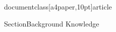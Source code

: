 documentclass[a4paper,10pt]{article}
\usepackage[a4paper, total={6in, 8in}]{geometry}

\usepackage[utf8]{inputenc}
\usepackage{verbatim}
\usepackage{fancyvrb}
\usepackage{listings}
\usepackage{graphicx}

\graphicspath{{/home/yannis/Thesis/img/}}



\lstset{
   breaklines=true,}

Section{Background Knowledge}
